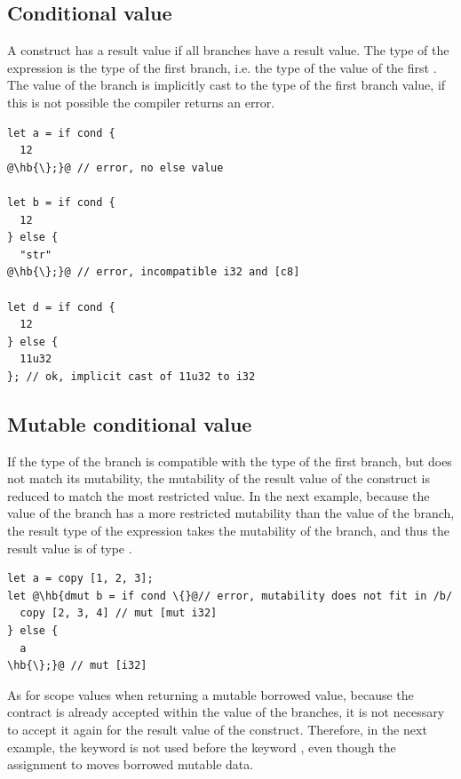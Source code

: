\subsection{Conditional value}
\label{sec:flow:cond_value_type}

A  construct has a result value if all branches have a result value.
The type of the expression is the type of the first branch, i.e. the type of the
value of the first . The value of the  branch is
implicitly cast to the type of the first branch value, if this is not possible
the compiler returns an error.

\begin{lstlisting}[style=coloredverbatimError, escapechar=@]
let a = if cond {
  12
@\hb{\};}@ // error, no else value

let b = if cond {
  12
} else {
  "str"
@\hb{\};}@ // error, incompatible i32 and [c8]

let d = if cond {
  12
} else {
  11u32
}; // ok, implicit cast of 11u32 to i32
\end{lstlisting}

\subsection{Mutable conditional value}

If the type of the  branch is compatible with the type of the first
branch, but does not match its mutability, the mutability of the result value of
the  construct is reduced to match the most restricted value. In the
next example, because the value of the  branch has a more
restricted mutability than the value of the  branch, the result type
of the expression takes the mutability of the  branch, and thus the
result value is of type .

\begin{lstlisting}[style=coloredverbatimError, escapechar=@]
let a = copy [1, 2, 3];
let @\hb{dmut b = if cond \{}@// error, mutability does not fit in /b/
  copy [2, 3, 4] // mut [mut i32]
} else {
  a
\hb{\};}@ // mut [i32]
\end{lstlisting}

As for scope values when returning a mutable borrowed value, because
the  contract is already accepted within the value of the
branches, it is not necessary to accept it again for the result value of the
 construct. Therefore, in the next example, the keyword
 is not used before the keyword , even though the
assignment to  moves borrowed mutable data.

